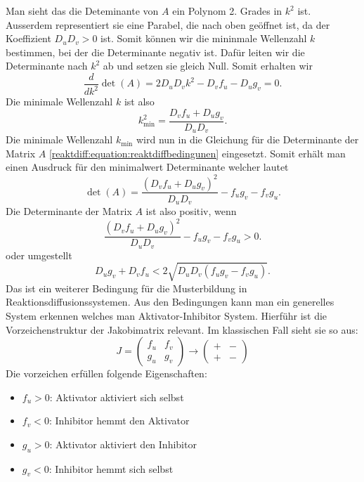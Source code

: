 Man sieht das die Deteminante von \(A\) ein Polynom 2. Grades in \(k^2\) ist.
Ausserdem representiert sie eine Parabel, die nach oben geöffnet ist, da der Koeffizient \(D_uD_v > 0\) ist.
Somit können wir die mininmale Wellenzahl \(k\) bestimmen, bei der die Determinante negativ ist.
Dafür leiten wir die Determinante nach \(k^2\) ab und setzen sie gleich Null.
Somit erhalten wir
\begin{equation*}
    \frac{d}{dk^2} \det(A) = 2D_uD_vk^2 - D_v f_u - D_u g_v = 0.
\end{equation*}
Die minimale Wellenzahl \(k\) ist also
\begin{equation*}
    k^2_{\text{min}} = \frac{D_vf_u + D_ug_v}{D_uD_v}.
\end{equation*}
Die minimale Wellenzahl \(k_{\text{min}}\) wird nun in die Gleichung für die Determinante der Matrix \(A\) \ref{reaktdiff:equation:reaktdiffbedingunen} eingesetzt.
Somit erhält man einen Ausdruck für den minimalwert Determinante welcher lautet
\begin{equation*}
    \det(A) = \frac{(D_vf_u + D_ug_v)^2}{D_uD_v} - f_u g_v - f_v g_u.
\end{equation*}
Die Determinante der Matrix \(A\) ist also positiv, wenn
\begin{equation*}
    \frac{(D_vf_u + D_ug_v)^2}{D_uD_v} - f_u g_v - f_v g_u > 0.
\end{equation*}
oder umgestellt
\begin{equation*}
    D_ug_v+D_vf_u < 2\sqrt{D_uD_v(f_u g_v - f_v g_u)}.
\end{equation*}
Das ist ein weiterer Bedingung für die Musterbildung in Reaktionsdiffusionssystemen.
Aus den Bedingungen kann man ein generelles System erkennen welches man Aktivator-Inhibitor System.
Hierführ ist die Vorzeichenstruktur der Jakobimatrix relevant.
Im klassischen Fall sieht sie so aus:
\begin{equation*}
        J =
    \begin{pmatrix}
        f_u & f_v\\
        g_u & g_v
    \end{pmatrix} 
    \rightarrow
    \begin{pmatrix}
        + & -\\
        + & -
    \end{pmatrix}
\end{equation*}
Die vorzeichen erfüllen folgende Eigenschaften:
\begin{itemize}
    \item \(f_u > 0\): Aktivator aktiviert sich selbst
    \item \(f_v < 0\): Inhibitor hemmt den Aktivator
    \item \(g_u > 0\): Aktivator aktiviert den Inhibitor
    \item \(g_v < 0\): Inhibitor hemmt sich selbst
\end{itemize}

